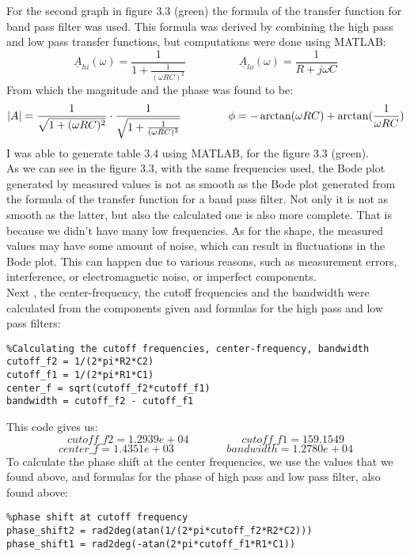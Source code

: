 \documentclass[12pt]{report}
\begin{document}
For the second graph in figure 3.3 (green) the formula of the transfer function for band pass filter was used. This formula was derived by combining the high pass and low pass transfer functions, but computations were done using MATLAB:
$$ \underline A_{hi}(\omega) = \frac{1}{1 + \frac{1}{(\omega RC)^2}}  \hspace{2cm} \underline A_{lo}(\omega) =  \frac{1}{R+j \omega C} $$
From which the magnitude and the phase was found to be:
$$|A| = \frac{1}{\sqrt{1 + (\omega RC)^2}} \cdot \frac{1}{\sqrt{1 + \frac{1}{(\omega RC)^2}}} \hspace{1.5cm} \phi = -\arctan(\omega RC) +\arctan(\frac{1}{\omega RC})$$ 
I was able to generate table 3.4 using MATLAB, for the figure 3.3 (green).\\
As we can see in the figure 3.3, with the same frequencies used, the Bode plot generated by measured values is not as smooth as the Bode plot generated from the formula of the transfer function for a band pass filter. Not only it is not as smooth as the latter, but also the calculated one is also more complete. That is because we didn't have many low frequencies. As for the shape, the measured values may have some amount of noise, which can result in fluctuations in the Bode plot. This can happen due to various reasons, such as measurement errors, interference, or electromagnetic noise, or imperfect components.\\
Next , the center-frequency, the cutoff frequencies and the bandwidth were calculated from the components given and formulas for the high pass and low pass filters:
\begin{verbatim}
%Calculating the cutoff frequencies, center-frequency, bandwidth
cutoff_f2 = 1/(2*pi*R2*C2)
cutoff_f1 = 1/(2*pi*R1*C1)
center_f = sqrt(cutoff_f2*cutoff_f1)
bandwidth = cutoff_f2 - cutoff_f1
\end{verbatim}
This code gives us: 
\newpage
$$ cutoff\_f2 = 1.2939e+04 \hspace{2cm} cutoff\_f1 = 159.1549 $$
$$ center\_f = 1.4351e+03 \hspace{2cm} bandwidth = 1.2780e+04$$
To calculate the phase shift at the center frequencies, we use the values that we found above, and formulas for the phase of high pass and low pass filter, also found above: \vspace{-0.1cm}
\begin{verbatim}
%phase shift at cutoff frequency
phase_shift2 = rad2deg(atan(1/(2*pi*cutoff_f2*R2*C2)))
phase_shift1 = rad2deg(-atan(2*pi*cutoff_f1*R1*C1))
\end{verbatim}
\end{document}
